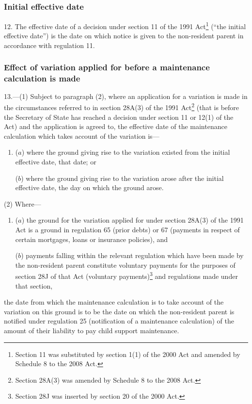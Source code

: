 \documentclass[12pt,a4paper]{article}
\begin{document}
\renewcommand\parthead{--- Part III Chapter I}

\subsubsection[12. Initial effective date]{Initial effective date}

12.  The effective date of a decision under section 11 of the 1991 Act\footnote{Section 11 was substituted by section 1(1) of the 2000 Act and amended by Schedule 8 to the 2008 Act.} (“the initial effective date”) is the date on which notice is given to the non-resident parent in accordance with regulation 11.

\subsubsection[13. Effect of variation applied for before a maintenance calculation is made]{Effect of variation applied for before a maintenance calculation is made}

13.---(1)  Subject to paragraph (2), where an application for a variation is made in the circumstances referred to in section 28A(3) of the 1991 Act\footnote{Section 28A(3) was amended by Schedule 8 to the 2008 Act.} (that is before the Secretary of State has reached a decision under section 11 or 12(1) of the Act) and the application is agreed to, the effective date of the maintenance calculation which takes account of the variation is—
\begin{enumerate}\item[]
($a$) where the ground giving rise to the variation existed from the initial effective date, that date; or

($b$) where the ground giving rise to the variation arose after the initial effective date, the day on which the ground arose.
\end{enumerate}

(2) Where—
\begin{enumerate}\item[]
($a$) the ground for the variation applied for under section 28A(3) of the 1991 Act is a ground in regulation 65 (prior debts) or 67 (payments in respect of certain mortgages, loans or insurance policies), and

($b$) payments falling within the relevant regulation which have been made by the non-resident parent constitute voluntary payments for the purposes of section 28J of that Act (voluntary payments)\footnote{Section 28J was inserted by section 20 of the 2000 Act.} and regulations made under that section,
\end{enumerate}
the date from which the maintenance calculation is to take account of the variation on this ground is to be the date on which the non-resident parent is notified under regulation 25 (notification of a maintenance calculation) of the amount of their liability to pay child support maintenance.
\end{document}
